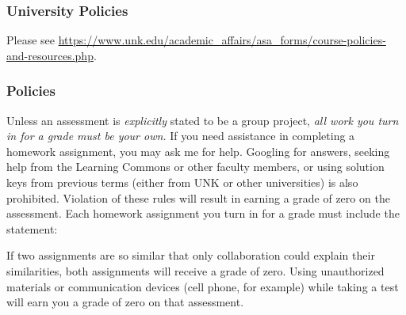 \documentclass[12pt]{article}
\newcounter{ex}\setcounter{ex}{0}
\begin{document}
\subsubsection*{University Policies}

Please see \url{https://www.unk.edu/academic_affairs/asa_forms/course-policies-and-resources.php}.

\subsubsection* {Policies}

Unless an assessment is \emph{explicitly} stated to be a group project,  \emph{all work you turn in for a grade must be your own.}  If you need assistance in completing a homework assignment, you may ask me for help. Googling for answers, seeking help from the Learning Commons or other faculty members,  or using solution keys from previous terms (either from UNK or other universities) is also prohibited.  Violation of these rules will result in earning a grade of zero on the assessment. Each homework assignment you turn in for a grade must include the statement:

\begin{quote}
\end{quote}
 If two assignments are so similar that only collaboration could explain their similarities, both assignments will receive a grade of zero.  Using unauthorized materials or communication devices (cell phone, for
example) while taking a test will earn you a grade of zero on that assessment.  

 
\end{document}
